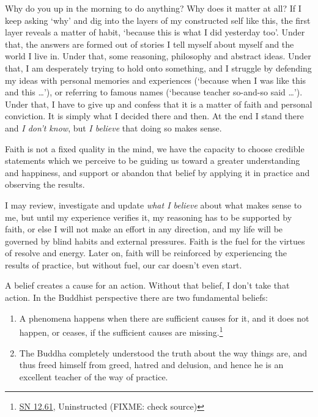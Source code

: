 Why do you up in the morning to do anything? Why does it matter at all?
If I keep asking `why' and dig into the layers of my constructed self
like this, the first layer reveals a matter of habit, `because this is
what I did yesterday too'. Under that, the answers are formed out of
stories I tell myself about myself and the world I live in. Under that,
some reasoning, philosophy and abstract ideas. Under that, I am
desperately trying to hold onto something, and I struggle by defending
my ideas with personal memories and experiences (`because when I was
like this and this \ldots{}'), or referring to famous names (`because
teacher so-and-so said \ldots{}'). Under that, I have to give up and
confess that it is a matter of faith and personal conviction. It is
simply what I decided there and then. At the end I stand there and
\emph{I don't know}, but \emph{I believe} that doing so makes sense.

Faith is not a fixed quality in the mind, we have the capacity to choose
credible statements which we perceive to be guiding us toward a greater
understanding and happiness, and support or abandon that belief by
applying it in practice and observing the results.

I may review, investigate and update \emph{what I believe} about what
makes sense to me, but until my experience verifies it, my reasoning has
to be supported by faith, or else I will not make an effort in any
direction, and my life will be governed by blind habits and external
pressures. Faith is the fuel for the virtues of resolve and energy.
Later on, faith will be reinforced by experiencing the results of
practice, but without fuel, our car doesn't even start.


A belief creates a cause for an action. Without that belief, I don't
take that action. In the Buddhist perspective there are two fundamental
beliefs:

\begin{enumerate}
\tightlist
\item
  A phenomena happens when there are sufficient causes for it, and it
  does not happen, or ceases, if the sufficient causes are
  missing.\footnote{\href{https://www.accesstoinsight.org/tipitaka/sn/sn12/sn12.061.than.html}{SN
    12.61}, Uninstructed (FIXME: check source)}
\item
  The Buddha completely understood the truth about the way things are,
  and thus freed himself from greed, hatred and delusion, and hence he
  is an excellent teacher of the way of practice.
\end{enumerate}

